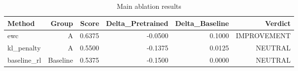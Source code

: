 \begin{table}[htbp]
\centering
\caption{Main ablation results}
\label{tab:main-results}
\begin{tabular}{lrrrrr}
\toprule
\textbf{Method} & \textbf{Group} & \textbf{Score} & \textbf{Delta\_Pretrained} & \textbf{Delta\_Baseline} & \textbf{Verdict} \\
\midrule
ewc & A & 0.6375 & -0.0500 & 0.1000 & IMPROVEMENT \\
kl\_penalty & A & 0.5500 & -0.1375 & 0.0125 & NEUTRAL \\
baseline\_rl & Baseline & 0.5375 & -0.1500 & 0.0000 & NEUTRAL \\
\bottomrule
\end{tabular}
\end{table}